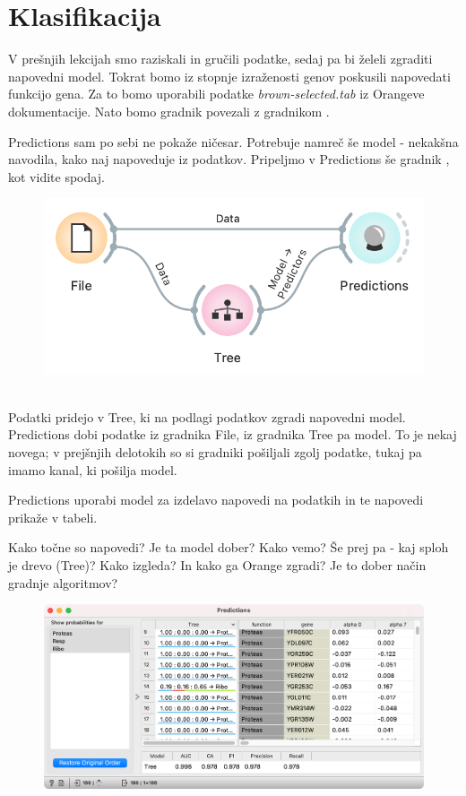 \chapter{Klasifikacija}
\label{ch:klasifikacija}

V prešnjih lekcijah smo raziskali in gručili podatke, sedaj pa bi želeli zgraditi napovedni model. Tokrat bomo iz stopnje izraženosti genov poskusili napovedati funkcijo gena. Za to bomo uporabili podatke \textit{brown-selected.tab} iz Orangeve dokumentacije. Nato bomo gradnik  povezali z gradnikom .

Predictions sam po sebi ne pokaže ničesar. Potrebuje namreč še model - nekakšna navodila, kako naj napoveduje iz podatkov. Pripeljmo v Predictions še gradnik , kot vidite spodaj.

\begin{figure}[h]
    \includegraphics[width=0.8\linewidth]{workflow.png}%
    \caption{$\;$}
\end{figure}

Podatki pridejo v Tree, ki na podlagi podatkov zgradi napovedni model. Predictions dobi podatke iz gradnika File, iz gradnika Tree pa model. To je nekaj novega; v prejšnjih delotokih so si gradniki pošiljali zgolj podatke, tukaj pa imamo kanal, ki pošilja model.

Predictions uporabi model za izdelavo napovedi na podatkih in te napovedi prikaže v tabeli.

Kako točne so napovedi? Je ta model dober? Kako vemo?
Še prej pa - kaj sploh je drevo (Tree)? Kako izgleda? In kako ga Orange zgradi? Je to dober način gradnje algoritmov?

\begin{figure}[h]
    \includegraphics[width=0.8\linewidth]{predictions.png}%
    \caption{$\;$}
\end{figure}
